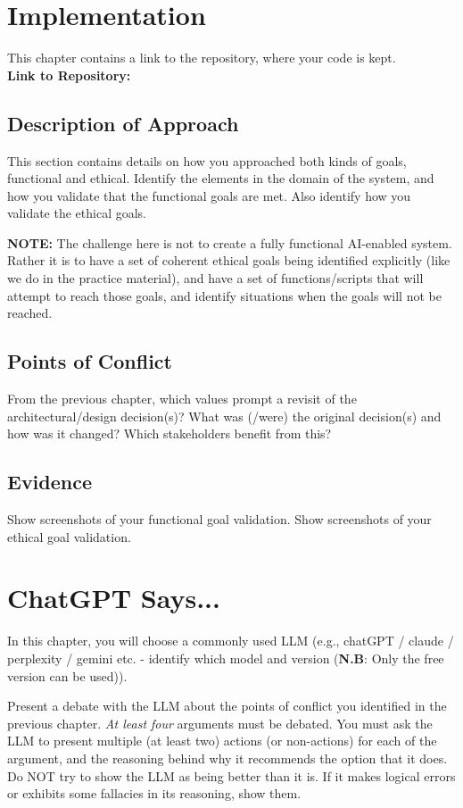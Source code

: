 \documentclass[]
{UCD_CS_41820_Report}
\begin{document}
\chapter{Implementation}
This chapter contains a link to the repository, where your code is kept.\\
\textbf{Link to Repository:} \href{}{} %

\section{Description of Approach}
This section contains details on how you approached both kinds of goals, functional and ethical. Identify the elements in the domain of the system, and how you validate that the functional goals are met. Also identify how you validate the ethical goals.

\textbf{NOTE:} The challenge here is not to create a fully functional AI-enabled system. Rather it is to have a set of coherent ethical goals being identified explicitly (like we do in the practice material), and have a set of functions/scripts that will attempt to reach those goals, and identify situations when the goals will not be reached.

\section{Points of Conflict}
From the previous chapter, which values prompt a revisit of the architectural/design decision(s)? What was (/were) the original decision(s) and how was it changed? Which stakeholders benefit from this?

\section{Evidence}
Show screenshots of your functional goal validation. Show screenshots of your ethical goal validation.



\chapter{ChatGPT Says...}
In this chapter, you will choose a commonly used LLM (e.g., chatGPT / claude / perplexity / gemini etc. - identify which model and version (\textbf{N.B}: Only the free version can be used)). 

Present a debate with the LLM about the points of conflict you identified in the previous chapter. \textit{At least four} arguments must be debated. You must ask the LLM to present multiple (at least two) actions (or non-actions) for each of the argument, and the reasoning behind why it recommends the option that it does. Do NOT try to show the LLM as being better than it is. If it makes logical errors or exhibits some fallacies in its reasoning, show them.
\end{document}
